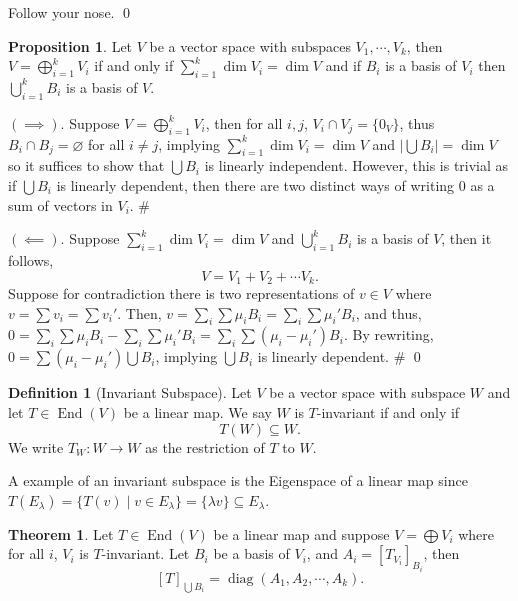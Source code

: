 \documentclass[
]{article}
\theoremstyle{definition}
\newtheorem{theorem}{Theorem}
\newtheorem{prop}{Proposition}[section]
\theoremstyle{definition}
\newtheorem{definition}{Definition}[section]
\begin{document}
Follow your nose. \qed

\begin{prop}
  Let \(V\) be a vector space with subspaces \(V_1, \cdots, V_k\), then 
  \(V = \bigoplus_{i = 1}^k V_i\) if and only if 
  \(\sum_{i = 1}^k \dim V_i = \dim V\) and if \(B_i\) is a basis of \(V_i\) then 
  \(\bigcup_{i = 1}^k B_i\) is a basis of \(V\).
\end{prop}
\proof

\((\implies)\). Suppose \(V = \bigoplus_{i = 1}^k V_i\), then for all
\(i, j\), \(V_i \cap V_j = \{0_V\}\), thus
\(B_i \cap B_j = \varnothing\) for all \(i \neq j\), implying
\(\sum_{i = 1}^k \dim V_i = \dim V\) and
\(\left| \bigcup B_i \right| = \dim V\) so it suffices to show that
\(\bigcup B_i\) is linearly independent. However, this is trivial as if
\(\bigcup B_i\) is linearly dependent, then there are two distinct ways
of writing 0 as a sum of vectors in \(V_i\). \#

\((\impliedby)\). Suppose \(\sum_{i = 1}^k \dim V_i = \dim V\) and
\(\bigcup_{i = 1}^k B_i\) is a basis of \(V\), then it follows,
\[V = V_1 + V_2 + \cdots V_k.\] Suppose for contradiction there is two
representations of \(v \in V\) where \(v = \sum v_i = \sum v_i'\). Then,
\(v = \sum_i \sum \mu_i B_i =  \sum_i \sum \mu_i' B_i\), and thus,
\(0 = \sum_i \sum \mu_i B_i -  \sum_i \sum \mu_i' B_i = \sum_i \sum (\mu_i - \mu_i') B_i\).
By rewriting, \(0 = \sum (\mu_i - \mu_i') \bigcup B_i\), implying
\(\bigcup B_i\) is linearly dependent. \# \qed

\begin{definition}[Invariant Subspace]
  Let \(V\) be a vector space with subspace \(W\) and let \(T \in \mathop{\mathrm{End}}(V)\) be 
  a linear map. We say \(W\) is \(T\)-invariant if and only if 
  \[T(W) \subseteq W.\]
  We write \(T_W : W \to W\) as the restriction of \(T\) to \(W\).
\end{definition}

A example of an invariant subspace is the Eigenspace of a linear map
since
\(T(E_\lambda) = \{ T(v) \mid v \in E_\lambda \} = \{\lambda v \} \subseteq E_\lambda\).

\begin{theorem}
  Let \(T \in \mathop{\mathrm{End}}(V)\) be a linear map and suppose \(V = \bigoplus V_i\) where 
  for all \(i\), \(V_i\) is \(T\)-invariant. Let \(B_i\) be a basis of \(V_i\),
  and \(A_i = [T_{V_i}]_{B_i}\), then 
  \[[T]_{\bigcup B_i} = \mathop{\mathrm{diag}}(A_1, A_2, \cdots, A_k).\] 
\end{theorem}
\proof
\end{document}
